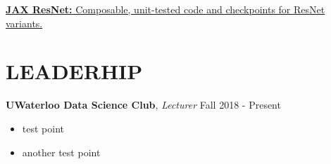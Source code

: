 \documentclass[line,margin]{res}
\begin{document}
\begin{resume}
    \href{https://pypi.org/project/shapecheck/}
    {\textbf{JAX ResNet: } Composable, unit-tested code and checkpoints for ResNet variants.}

\section{LEADERHIP}
    \textbf{UWaterloo Data Science Club}, \textit{Lecturer} \hfill Fall 2018 - Present\\
        \vspace{-4mm}
        \begin{itemize}  \itemsep -2pt %
        \item test point
        \item another test point
        \end{itemize}

\end{resume}
\end{document}
